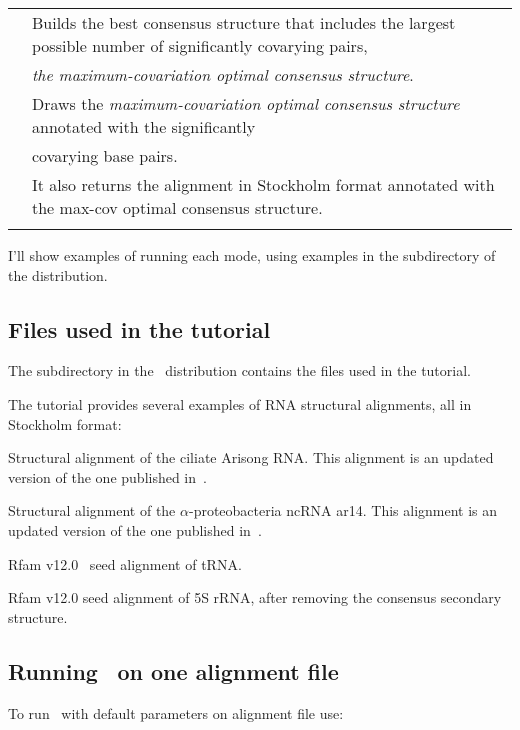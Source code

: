 \begin{tabular}{ll}
\textbf{}   & Builds the best consensus structure that includes the largest possible number of significantly covarying pairs,\\
\textbf{}   & \hspace{5mm}\emph{the maximum-covariation optimal consensus structure}.\\
\textbf{}   & Draws the \emph{maximum-covariation optimal consensus structure} annotated with the significantly \\
\textbf{}   & \hspace{5mm}covarying base pairs.\\
\textbf{}   & It also returns the alignment in Stockholm format annotated with the max-cov optimal consensus structure.\\
 & \\ 
\end{tabular}


I'll show examples of running each mode, using examples in the
 subdirectory of the distribution.


\subsection{Files used in the tutorial}

The subdirectory  in the \rscape\ distribution contains the
files used in the tutorial. 

The tutorial provides several examples of RNA structural
alignments, all in Stockholm format:

\begin{sreitems}{}
\item[\emprog{updated\_Arisong.sto}] Structural alignment of the ciliate
  Arisong RNA. This alignment is an updated
  version of the one published in~\citep{JungEddy11}.
\item[\emprog{ar14.sto}] Structural alignment of the $\alpha$-proteobacteria ncRNA ar14. This alignment is an updated version of the one
  published in~\citep{delVal12}.
\item[\emprog{RF00005.sto}] Rfam v12.0~\citep{Nawrocki15} seed alignment of tRNA. 
\item[\emprog{RF00001-noss.sto}] Rfam v12.0 seed alignment of 5S rRNA, after removing the consensus secondary structure. 
\end{sreitems}


\subsection{Running \rscape\, on one alignment file}
To run \rscape\ with default parameters on alignment file
 use:\\

